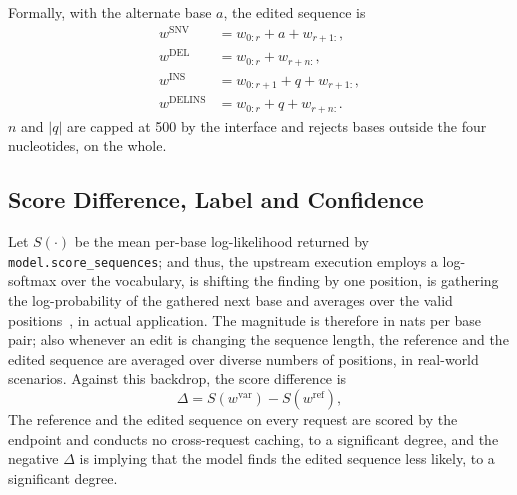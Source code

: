 \documentclass[10pt,journal]{IEEEtran}
\begin{document}
Formally, with the alternate base $a$, the edited sequence is
\begin{align}
w^{\mathrm{SNV}} &= w_{0:r} + a + w_{r+1:}, \label{eq:snv}\\
w^{\mathrm{DEL}} &= w_{0:r} + w_{r+n:}, \label{eq:del}\\
w^{\mathrm{INS}} &= w_{0:r+1} + q + w_{r+1:}, \label{eq:ins}\\
w^{\mathrm{DELINS}} &= w_{0:r} + q + w_{r+n:}. \label{eq:delins}
\end{align}
$n$ and $|q|$ are capped at 500 by the interface and rejects bases outside the four nucleotides, on the whole.

\subsection{Score Difference, Label and Confidence}
Let $S(\cdot)$ be the mean per-base log-likelihood returned by \texttt{model.score\_sequences}; and thus, the upstream execution employs a log-softmax over the vocabulary, is shifting the finding by one position, is gathering the log-probability of the gathered next base and averages over the valid positions~\cite{brixi2026evo2}, in actual application. The magnitude is therefore in nats per base pair; also whenever an edit is changing the sequence length, the reference and the edited sequence are averaged over diverse numbers of positions, in real-world scenarios. Against this backdrop, the score difference is
\begin{equation}
\Delta = S(w^{\mathrm{var}}) - S(w^{\mathrm{ref}}),
\label{eq:delta}
\end{equation}
The reference and the edited sequence on every request are scored by the endpoint and conducts no cross-request caching, to a significant degree, and the negative $\Delta$ is implying that the model finds the edited sequence less likely, to a significant degree.
\end{document}
